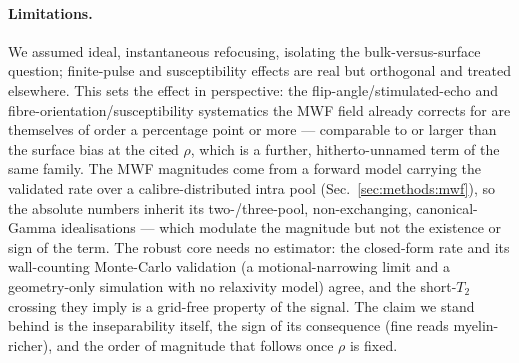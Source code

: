 \paragraph{Limitations.} We assumed ideal, instantaneous refocusing, isolating the
bulk-versus-surface question; finite-pulse and susceptibility effects are real but
orthogonal and treated elsewhere. This sets the effect in perspective: the
flip-angle/stimulated-echo and fibre-orientation/susceptibility \citep{Birkl2021}
systematics the MWF field already corrects for are themselves of order a percentage point
or more --- comparable to or larger than the surface bias at the cited $\rho$, which is a
further, hitherto-unnamed term of the same family. The MWF magnitudes come from a forward
model carrying the validated rate over a calibre-distributed intra pool
(Sec.~\ref{sec:methods:mwf}), so the absolute numbers inherit its two-/three-pool,
non-exchanging, canonical-Gamma idealisations --- which modulate the magnitude but not the
existence or sign of the term. The robust core needs no estimator: the closed-form rate and
its wall-counting Monte-Carlo validation (a motional-narrowing limit and a geometry-only
simulation with no relaxivity model) agree, and the short-$T_2$ crossing they imply is a
grid-free property of the signal. The claim we stand behind is the inseparability itself,
the sign of its consequence (fine reads myelin-richer), and the order of magnitude that
follows once $\rho$ is fixed.

